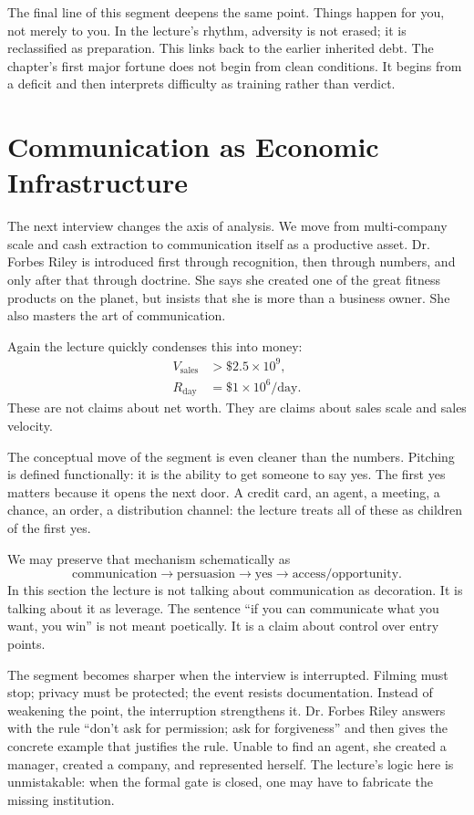 The final line of this segment deepens the same point. Things happen for you, not merely to you. In the lecture's rhythm, adversity is not erased; it is reclassified as preparation. This links back to the earlier inherited debt. The chapter's first major fortune does not begin from clean conditions. It begins from a deficit and then interprets difficulty as training rather than verdict.

\section{Communication as Economic Infrastructure}

The next interview changes the axis of analysis. We move from multi-company scale and cash extraction to communication itself as a productive asset. Dr. Forbes Riley is introduced first through recognition, then through numbers, and only after that through doctrine. She says she created one of the great fitness products on the planet, but insists that she is more than a business owner. She also masters the art of communication.

Again the lecture quickly condenses this into money:
\begin{align}
V_{\text{sales}} &> \$2.5 \times 10^9,\\
R_{\text{day}} &= \$1 \times 10^6/\text{day}.
\end{align}
These are not claims about net worth. They are claims about sales scale and sales velocity.

The conceptual move of the segment is even cleaner than the numbers. Pitching is defined functionally: it is the ability to get someone to say yes. The first yes matters because it opens the next door. A credit card, an agent, a meeting, a chance, an order, a distribution channel: the lecture treats all of these as children of the first yes.

We may preserve that mechanism schematically as
\begin{equation}
\text{communication} \to \text{persuasion} \to \text{yes} \to \text{access/opportunity}.
\end{equation}
In this section the lecture is not talking about communication as decoration. It is talking about it as leverage. The sentence ``if you can communicate what you want, you win'' is not meant poetically. It is a claim about control over entry points.

The segment becomes sharper when the interview is interrupted. Filming must stop; privacy must be protected; the event resists documentation. Instead of weakening the point, the interruption strengthens it. Dr. Forbes Riley answers with the rule ``don't ask for permission; ask for forgiveness'' and then gives the concrete example that justifies the rule. Unable to find an agent, she created a manager, created a company, and represented herself. The lecture's logic here is unmistakable: when the formal gate is closed, one may have to fabricate the missing institution.

